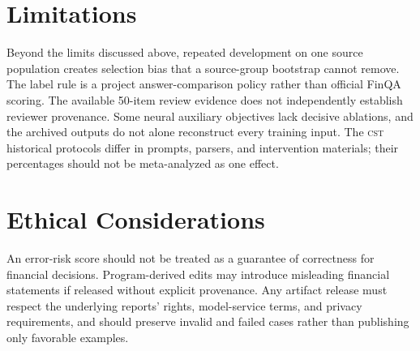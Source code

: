 \documentclass[11pt]{article}
\newcommand{\CST}{\textsc{cst}}
\begin{document}
\section*{Limitations}
Beyond the limits discussed above, repeated development on one source population creates selection bias that a source-group bootstrap cannot remove. The label rule is a project answer-comparison policy rather than official FinQA scoring. The available 50-item review evidence does not independently establish reviewer provenance. Some neural auxiliary objectives lack decisive ablations, and the archived outputs do not alone reconstruct every training input. The \CST{} historical protocols differ in prompts, parsers, and intervention materials; their percentages should not be meta-analyzed as one effect.

\section*{Ethical Considerations}
An error-risk score should not be treated as a guarantee of correctness for financial decisions. Program-derived edits may introduce misleading financial statements if released without explicit provenance. Any artifact release must respect the underlying reports' rights, model-service terms, and privacy requirements, and should preserve invalid and failed cases rather than publishing only favorable examples.



\end{document}
